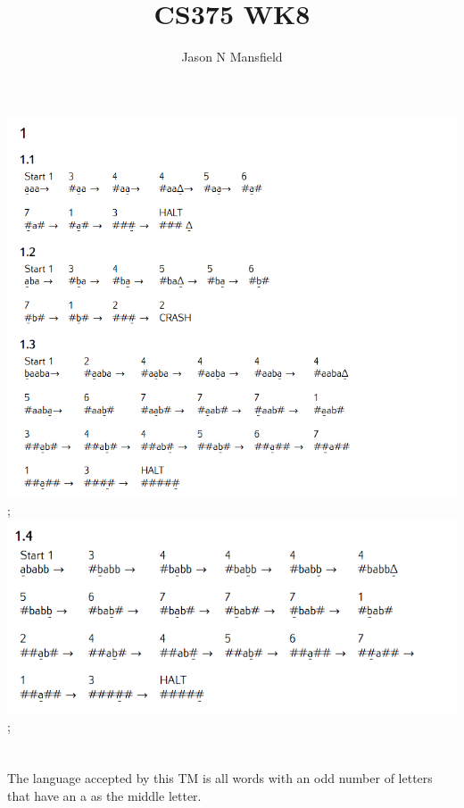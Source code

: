 \documentclass[12pt]{article}
\begin{document}
\title{CS375 WK8}
\author{Jason N Mansfield}
\maketitle


\begin{center}
\includegraphics[scale=0.5]{Screen1};
\clearpage
\includegraphics[scale=0.5]{Screen2};
\end{center}
\setcounter{section}{1}
\section{}
The language accepted by this TM is all words with an odd number of letters that have an a as
the middle letter.
\end{document}
